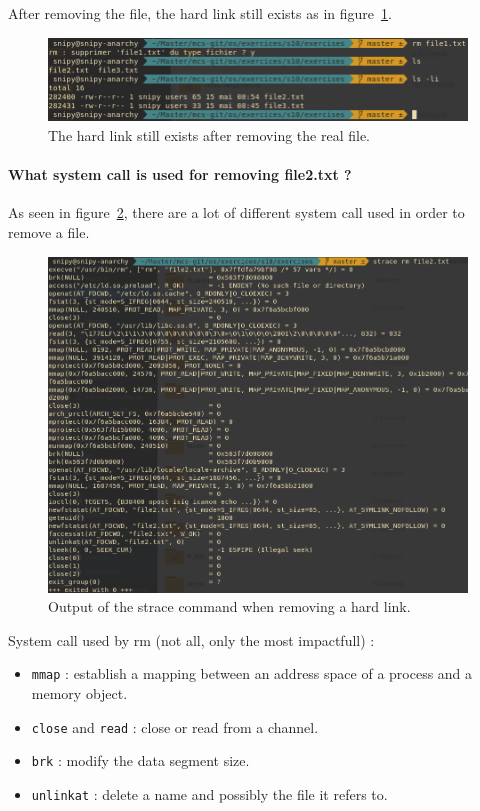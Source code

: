\documentclass[a4paper,11pt]{report}
\begin{document}
After removing the file, the hard link still exists as in
figure~\ref{fig:ex5-d}.

\begin{figure}[h]
  \centering
  \includegraphics[width=0.99\textwidth]{figures/ex5-d}
  \caption{\label{fig:ex5-d} The hard link still exists after removing the real file.}
\end{figure}

\paragraph{What system call is used for removing file2.txt ?}

As seen in figure~\ref{fig:ex5-e}, there are a lot of different system call
used in order to remove a file.

\begin{figure}[h]
  \centering
  \includegraphics[width=0.99\textwidth]{figures/ex5-e}
  \caption{\label{fig:ex5-e} Output of the strace command when removing a hard link.}
\end{figure}

System call used by rm (not all, only the most impactfull) :

\begin{itemize}
\item \verb+mmap+ : establish a mapping between an address space of a process
  and a memory object.
\item \verb+close+ and \verb+read+ : close or read from a channel.
\item \verb+brk+ : modify the data segment size.
\item \verb+unlinkat+ : delete a name and possibly the file it refers to.
\end{itemize}
\end{document}
